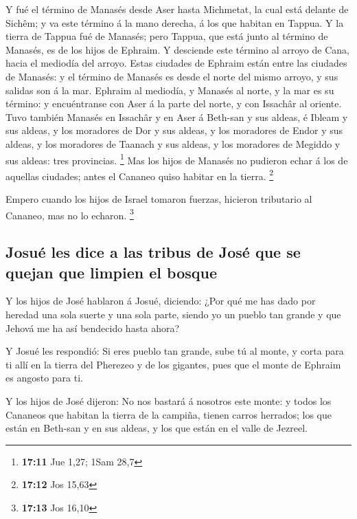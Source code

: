  Y fué el término de Manasés desde Aser hasta Michmetat,
la cual está delante de Sichêm; y va este término á la mano derecha, á
los que habitan en Tappua.  Y la tierra de Tappua fué de
Manasés; pero Tappua, que está junto al término de Manasés, es de los
hijos de Ephraim.  Y desciende este término al arroyo de
Cana, hacia el mediodía del arroyo. Estas ciudades de Ephraim están
entre las ciudades de Manasés: y el término de Manasés es desde el norte
del mismo arroyo, y sus salidas son á la mar.  Ephraim al
mediodía, y Manasés al norte, y la mar es su término: y encuéntranse con
Aser á la parte del norte, y con Issachâr al oriente. 
Tuvo también Manasés en Issachâr y en Aser á Beth-san y sus aldeas, é
Ibleam y sus aldeas, y los moradores de Dor y sus aldeas, y los
moradores de Endor y sus aldeas, y los moradores de Taanach y sus
aldeas, y los moradores de Megiddo y sus aldeas: tres provincias.
\footnote{\textbf{17:11} Jue 1,27; 1Sam 28,7}  Mas los
hijos de Manasés no pudieron echar á los de aquellas ciudades; antes el
Cananeo quiso habitar en la tierra. \footnote{\textbf{17:12} Jos 15,63}

 Empero cuando los hijos de Israel tomaron fuerzas,
hicieron tributario al Cananeo, mas no lo echaron. \footnote{\textbf{17:13}
  Jos 16,10}

\hypertarget{josuuxe9-les-dice-a-las-tribus-de-josuxe9-que-se-quejan-que-limpien-el-bosque}{%
\subsection{Josué les dice a las tribus de José que se quejan que
limpien el
bosque}\label{josuuxe9-les-dice-a-las-tribus-de-josuxe9-que-se-quejan-que-limpien-el-bosque}}

 Y los hijos de José hablaron á Josué, diciendo: ¿Por qué
me has dado por heredad una sola suerte y una sola parte, siendo yo un
pueblo tan grande y que Jehová me ha así bendecido hasta ahora?

 Y Josué les respondió: Si eres pueblo tan grande, sube
tú al monte, y corta para ti allí en la tierra del Pherezeo y de los
gigantes, pues que el monte de Ephraim es angosto para ti.

 Y los hijos de José dijeron: No nos bastará á nosotros
este monte: y todos los Cananeos que habitan la tierra de la campiña,
tienen carros herrados; los que están en Beth-san y en sus aldeas, y los
que están en el valle de Jezreel.

